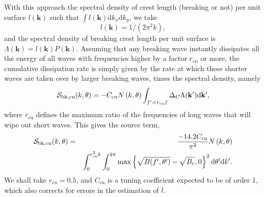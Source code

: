 With this approach the spectral density of crest length (breaking or not)  per unit surface
$l(\mathbf{k})$ such that $\int l(\mathbf{k}) \mathrm{d}k_x \mathrm{d}k_y$, we take
\begin{equation}
l(\mathbf{k})= 1/(2\pi^2 k),
\end{equation}
and the spectral density of breaking crest length per unit surface is 
$\Lambda(\mathbf{k})=l(\mathbf{k})P(\mathbf{k})$. 
Assuming that any breaking wave instantly dissipates all the energy of all waves with frequencies higher by a factor $r_{\mathrm{cu}}$ or more,
the cumulative dissipation rate is simply given by the rate at which these shorter waves are taken over by larger breaking waves, times the spectral density, namely 
\begin{equation}
{\cal S}_{\mathrm{bk,cu}}(k,\theta) = -C_{\mathrm{cu}}  N \left(k,\theta\right) \int_{f' < r_{\mathrm{cu}} f } \Delta_C \Lambda(\mathbf{k'}) \mathrm{d\mathbf{k'}},
\label{Sds_cu1}
\end{equation}
where $r_{\mathrm{cu}}$ defines the maximum ratio of the frequencies of long waves that will wipe out short waves. 
This  gives the
source term, 
\begin{eqnarray}
{\cal S}_{\mathrm{bk,cu}}(k,\theta) &=&  \frac{-14.2 C_{\mathrm{cu}}}{\pi^2}  N \left(k,\theta\right)
 \nonumber \\
& &\int_0^{ r^2_{\mathrm{cu}} k }\int_0^{2\pi}
\max \left\{\sqrt{B(f',\theta')}-\sqrt{B_r},0\right\}^2
\mathrm{d}\theta' \mathrm{d}k'.
\label{Sds_sat_isotropic}
\end{eqnarray}
We shall 
take $r_{\mathrm{cu}}=0.5$, and $C_{\mathrm{cu}}$ is a tuning coefficient expected to be of order 1, which also corrects for errors in the estimation of $l$. 
